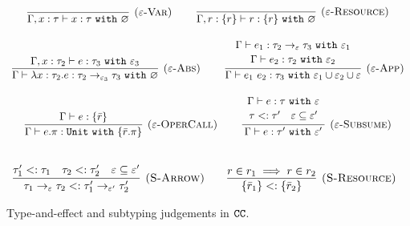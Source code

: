\begin{figure}
\vspace*{-5mm}
\noindent
{}
\vspace{-0mm}
\[
\begin{array}{c}
\infer[\textsc{($\varepsilon$-Var)}]
	{ \Gamma, x:\tau \vdash x: \tau~\kw{with} \varnothing }
	{}
	
	~~~~~~~
	
\infer[\textsc{($\varepsilon$-Resource)}]
 	{ \Gamma, r: \{ r \} \vdash r : \{ r \}~\kw{with} \varnothing }
 	{} \\[3ex]
 	
	\infer[\textsc{($\varepsilon$-Abs)}]
	{ \Gamma \vdash \lambda x:\tau_2 . e : \tau_2 \rightarrow_{\varepsilon_3} \tau_3~\kw{with} \varnothing }
	{ \Gamma, x: \tau_2 \vdash e: \tau_3~\kw{with} \varepsilon_3 }
	
	~~~~~~~
	
\infer[\textsc{($\varepsilon$-App)}]
	{ \Gamma \vdash e_1~e_2 : \tau_3~\kw{with} \varepsilon_1 \cup \varepsilon_2 \cup \varepsilon  }
	{ \begin{array}{c}
            \Gamma \vdash e_1: \tau_2 \rightarrow_{\varepsilon} \tau_3~\kw{with} \varepsilon_1 \\[.6mm]
            \Gamma \vdash e_2: \tau_2~\kw{with} \varepsilon_2
          \end{array} } \\[3ex]
	
\infer[\textsc{($\varepsilon$-OperCall)}]
	{ \Gamma \vdash e.\pi: \kw{Unit} \kw{with} \{ \bar r.\pi \} }
	{ \Gamma \vdash e: \{ \bar r \} } 

	~~~~~~~

\infer[\textsc{($\varepsilon$-Subsume)}]
	{ \Gamma \vdash e: \tau' ~\kw{with} \varepsilon'}
	{ \begin{array}{c} 
            \Gamma \vdash e: \tau ~\kw{with} \varepsilon \\[.6mm]
            \tau <: \tau' ~~~ \varepsilon \subseteq \varepsilon'
          \end{array}}\\[3ex]
\end{array}
\]


\[
\begin{array}{c}
\infer[\textsc{(S-Arrow)}]
	{ \tau_1 \rightarrow_{\varepsilon} \tau_2 <: \tau_1' \rightarrow_{\varepsilon'} \tau_2' }
	{ \tau_1' <: \tau_1 & \tau_2 <: \tau_2' & \varepsilon \subseteq \varepsilon' }
~~~~~~
\infer[\textsc{(S-Resource)}]
	{ \{ \bar r_1 \} <: \{ \bar r_2 \} }
	{ r \in r_1 \implies r \in r_2 }
\end{array}
\]
\vspace*{-5mm}
\caption{Type-and-effect and subtyping judgements in $\mathtt{CC}$.}
\vspace*{-5mm}
\label{fig:cc_static_rules}
\end{figure}

